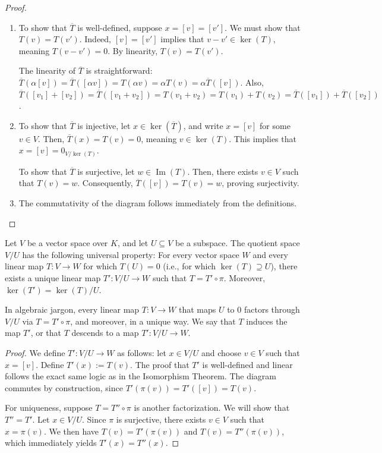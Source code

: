 \begin{proof}
  \begin{enumerate}
    \item To show that $\overline{T}$ is well-defined, suppose $x = [v] = [v']$. We must show that $T(v) = T(v')$. Indeed, $[v] = [v']$ implies that $v - v' \in \ker(T)$, meaning $T(v - v') = 0$. By linearity, $T(v) = T(v')$.

    The linearity of $\overline{T}$ is straightforward: $\overline{T}(\alpha[v]) = \overline{T}([\alpha v]) = T(\alpha v) = \alpha T(v) = \alpha \overline{T}([v])$. Also, $\overline{T}([v_1] + [v_2]) = \overline{T}([v_1 + v_2]) = T(v_1 + v_2) = T(v_1) + T(v_2) = \overline{T}([v_1]) + \overline{T}([v_2])$.

    \item To show that $\overline{T}$ is injective, let $x \in \ker(\overline{T})$, and write $x = [v]$ for some $v \in V$. Then, $\overline{T}(x) = T(v) = 0$, meaning $v \in \ker(T)$. This implies that $x = [v] = 0_{V/\ker(T)}$.

    To show that $\overline{T}$ is surjective, let $w \in \operatorname{Im}(T)$. Then, there exists $v \in V$ such that $T(v) = w$. Consequently, $\overline{T}([v]) = T(v) = w$, proving surjectivity.

    \item The commutativity of the diagram follows immediately from the definitions.
  \end{enumerate}
\end{proof}

\begin{theorem}
  Let $V$ be a vector space over $K$, and let $U \subseteq V$ be a subspace. The quotient space $V/U$ has the following universal property: For every vector space $W$ and every linear map $T \colon V \to W$ for which $T(U) = 0$ (i.e., for which $\ker(T) \supseteq U$), there exists a unique linear map $T' \colon V/U \to W$ such that $T = T' \circ \pi$. Moreover, $\ker(T') = \ker(T)/U$.
\end{theorem}

\begin{remark}
  In algebraic jargon, every linear map $T \colon V \to W$ that maps $U$ to $0$ factors through $V/U$ via $T = T' \circ \pi$, and moreover, in a unique way. We say that $T$ induces the map $T'$, or that $T$ descends to a map $T' \colon V/U \to W$.
\end{remark}

\begin{proof}
  We define $T' \colon V/U \to W$ as follows: let $x \in V/U$ and choose $v \in V$ such that $x = [v]$. Define $T'(x) := T(v)$. The proof that $T'$ is well-defined and linear follows the exact same logic as in the Isomorphism Theorem. The diagram commutes by construction, since $T'(\pi(v)) = T'([v]) = T(v)$.

  For uniqueness, suppose $T = T'' \circ \pi$ is another factorization. We will show that $T'' = T'$. Let $x \in V/U$. Since $\pi$ is surjective, there exists $v \in V$ such that $x = \pi(v)$. We then have $T(v) = T'(\pi(v))$ and $T(v) = T''(\pi(v))$, which immediately yields $T'(x) = T''(x)$.
\end{proof}

